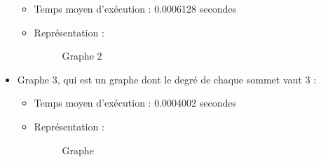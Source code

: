 \documentclass[a4paper, 11pt, oneside]{article}
\begin{document}
\begin{itemize}
\begin{itemize}
			\item Temps moyen d'exécution : 0.0006128 secondes
			\item Représentation :
			\begin{figure}[h]%
				\centering
				\qquad
				\caption{Graphe 2}%
				\label{fig:graphe2}%
			\end{figure}
		\end{itemize}
		\newpage
		\item Graphe 3, qui est un graphe dont le degré de chaque sommet vaut 3 :
		\begin{itemize}
			\item Temps moyen d'exécution : 0.0004002 secondes
			\item Représentation :
			\begin{figure}[h]%
				\centering
				\qquad
				\caption{Graphe }%
				\label{fig:grphe3}%
			\end{figure}
		\end{itemize}
	\end{itemize}
	\newpage
\end{document}
